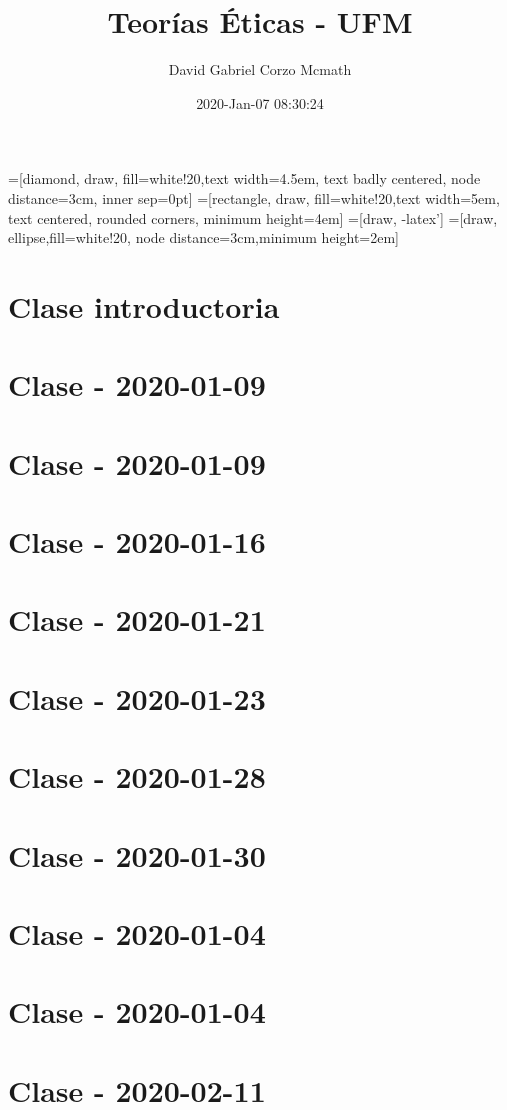 \documentclass{book}
\title{Teorías Éticas - UFM}
\author{David Gabriel Corzo Mcmath}
\date{2020-Jan-07 08:30:24}
\begin{document}
\maketitle
\tableofcontents

=[diamond, draw, fill=white!20,text width=4.5em, text badly centered, node distance=3cm, inner sep=0pt]
=[rectangle, draw, fill=white!20,text width=5em, text centered, rounded corners, minimum height=4em]
=[draw, -latex']
=[draw, ellipse,fill=white!20, node distance=3cm,minimum height=2em]


\chapter{Clase introductoria}


\chapter{Clase - 2020-01-09}


\chapter{Clase - 2020-01-09}


\chapter{Clase - 2020-01-16}


\chapter{Clase - 2020-01-21}


\chapter{Clase - 2020-01-23}


\chapter{Clase - 2020-01-28}


\chapter{Clase - 2020-01-30}


\chapter{Clase - 2020-01-04}


\chapter{Clase - 2020-01-04}


\chapter{Clase - 2020-02-11}

\end{document}
